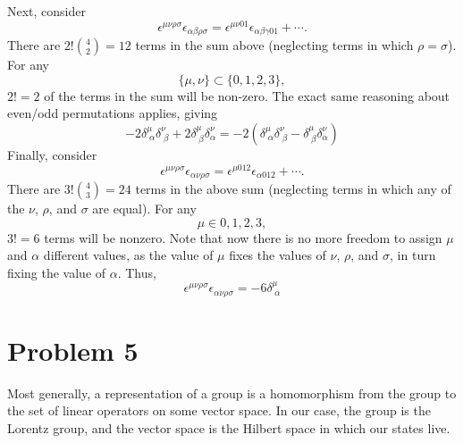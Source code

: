 \documentclass[12pt]{article}
\begin{document}
Next, consider
\[ \epsilon^{\mu\nu\rho\sigma}\epsilon_{\alpha\beta\rho\sigma} = \epsilon^{\mu\nu 01}\epsilon_{\alpha\beta\gamma 01} + \cdots . \]
There are $2!\binom{4}{2} = 12$ terms in the sum above (neglecting terms in which $\rho = \sigma$). For any
\[ \{\mu, \nu\} \subset \{0,1,2,3\}, \]
$2! = 2$ of the terms in the sum will be non-zero. The exact same reasoning about even/odd permutations applies, giving
\[ -2\delta_{\;\alpha}^\mu\delta_{\;\beta}^\nu + 2\delta_{\;\beta}^\mu\delta_{\alpha}^\nu = -2(\delta_{\;\alpha}^\mu\delta_{\;\beta}^\nu - \delta_{\;\beta}^\mu\delta_{\alpha}^\nu) \]
Finally, consider
\[ \epsilon^{\mu\nu\rho\sigma}\epsilon_{\alpha\nu\rho\sigma} = \epsilon^{\mu 012}\epsilon_{\alpha 012} + \cdots . \]
There are $3!\binom{4}{3} = 24$ terms in the above sum (neglecting terms in which any of the $\nu$, $\rho$, and $\sigma$ are equal). For any
\[ \mu \in {0,1,2,3}, \]
$3! = 6$ terms will be nonzero. Note that now there is no more freedom to assign $\mu$ and $\alpha$ different values, as the value of $\mu$ fixes the values of $\nu$, $\rho$, and $\sigma$, in turn fixing the value of $\alpha$. Thus,
\[ \epsilon^{\mu\nu\rho\sigma}\epsilon_{\alpha\nu\rho\sigma} = - 6\delta_{\;\alpha}^\mu \]


\section*{Problem 5}
Most generally, a representation of a group is a homomorphism from the group to the set of linear operators on some vector space. In our case, the group is the Lorentz group, and the vector space is the Hilbert space in which our states live.
\end{document}
